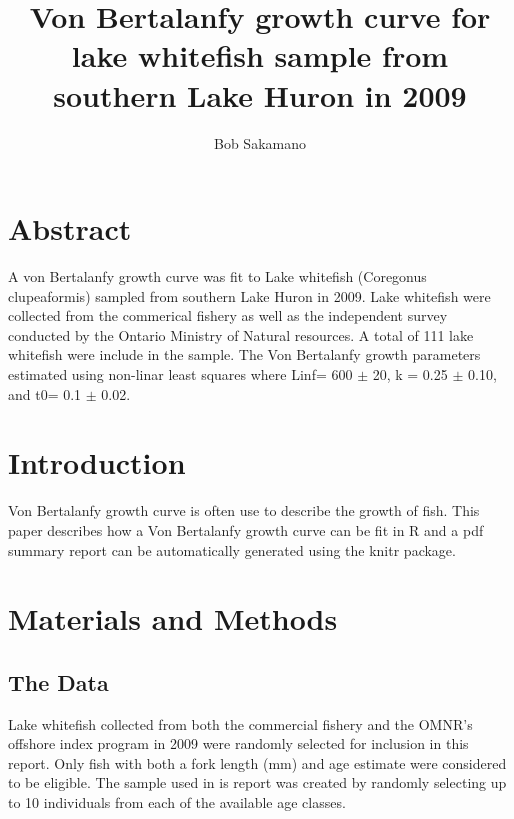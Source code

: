 \documentclass{article}\usepackage[]{graphicx}\usepackage[]{color}
\begin{document}
\graphicspath{{figures/}}


\title{Von Bertalanfy growth curve for lake whitefish sample from
       southern Lake Huron in 2009}

\author{Bob Sakamano}

\maketitle

\section*{Abstract}
\label{sec:abstract}

A von Bertalanfy growth curve was fit to Lake whitefish (Coregonus
clupeaformis) sampled from southern Lake Huron in 2009.  Lake
whitefish were collected from the commerical fishery as well as the
independent survey conducted by the Ontario Ministry of Natural
resources.  A total of 111 lake whitefish were include in the sample.
The Von Bertalanfy growth parameters estimated using non-linar least
squares where Linf= 600 $\pm$ 20, k = 0.25 $\pm$ 0.10, and t0= 0.1
$\pm$ 0.02.


\section*{Introduction}
\label{sec:introduction}

Von Bertalanfy growth curve is often use to describe the growth of
fish.  This paper describes how a Von Bertalanfy growth curve can be
fit in R and a pdf summary report can be automatically generated using
the knitr package.












\section*{Materials and Methods}
\label{sec:Materials_and_Methods}

\subsection*{The Data}
\label{sub:the_data}

Lake whitefish collected from both the commercial fishery and the
OMNR's offshore index program in 2009 were randomly selected for
inclusion in this report.  Only fish with both a fork length (mm) and
age estimate were considered to be eligible.  The sample used in is
report was created by randomly selecting up to 10 individuals from each
of the available age classes.
\end{document}
